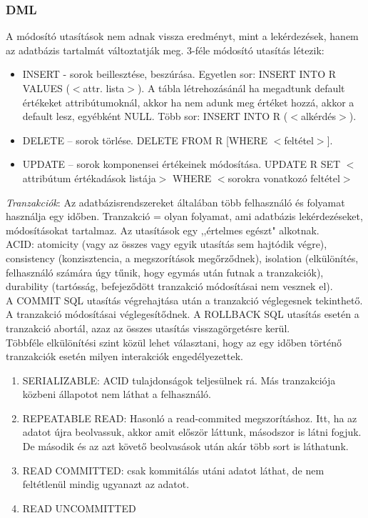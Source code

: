 \documentclass[margin=0px]{article}
\begin{document}
	\subsubsection{DML}
	
	A módosító utasítások nem adnak vissza eredményt, mint a lekérdezések, hanem az adatbázis tartalmát változtatják meg. 3-féle módosító utasítás létezik:
	\begin{itemize}
		\item INSERT - sorok beillesztése, beszúrása. Egyetlen sor: INSERT INTO R VALUES ($<$attr. lista$>$). A tábla létrehozásánál ha megadtunk default értékeket attribútumoknál, akkor ha nem adunk meg értéket hozzá, akkor a default lesz, egyébként NULL. Több sor: INSERT INTO R ($<$alkérdés$>$).
		\item DELETE – sorok törlése. DELETE FROM R [WHERE $<$feltétel$>$].
		\item UPDATE – sorok komponensei értékeinek módosítása. UPDATE R SET $<$attribútum értékadások listája$>$ WHERE $<$sorokra vonatkozó feltétel$>$
	\end{itemize}
	\textit{Tranzakciók}: Az adatbázisrendszereket általában több felhasználó és folyamat használja egy időben. Tranzakció = olyan folyamat, ami adatbázis lekérdezéseket, módosításokat tartalmaz. Az utasítások egy ,,értelmes egészt" alkotnak. \\
	ACID: atomicity (vagy az összes vagy egyik utasítás sem hajtódik végre), consistency (konzisztencia, a megszorítások megőrződnek), isolation (elkülönítés, felhasználó számára úgy tűnik, hogy egymás után futnak a tranzakciók), durability (tartósság, befejeződött tranzakció módosításai nem vesznek el). \\
	A COMMIT SQL utasítás végrehajtása után a tranzakció véglegesnek tekinthető. A tranzakció módosításai véglegesítődnek. A ROLLBACK SQL utasítás esetén a tranzakció abortál, azaz az összes utasítás visszagörgetésre kerül. \\
	Többféle elkülönítési szint közül lehet választani, hogy az egy időben történő tranzakciók esetén milyen interakciók engedélyezettek.
	\begin{enumerate}
		\item SERIALIZABLE: ACID tulajdonságok teljesülnek rá. Más tranzakciója közbeni állapotot nem láthat a felhasználó.
		\item REPEATABLE READ: Hasonló a read-commited megszorításhoz. Itt, ha az adatot újra beolvassuk, akkor amit először láttunk, másodszor is látni fogjuk. De második és az azt követő beolvasások után akár több sort is láthatunk.
		\item READ COMMITTED: csak kommitálás utáni adatot láthat, de nem feltétlenül mindig ugyanazt az adatot.
		\item READ UNCOMMITTED
	\end{enumerate}
	
\end{document}
